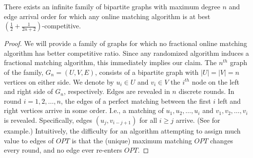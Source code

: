 \begin{thm}\label{thm:hardness}
There exists an infinite family of bipartite graphs with maximum degree $n$ and edge arrival order for which any online matching algorithm is at best $\left(\frac{1}{2}+\frac{1}{2n+2}\right)$-competitive.
\end{thm}
\begin{proof}
We will provide a family of graphs for which no fractional online matching algorithm has better competitive ratio. Since any randomized algorithm induces a fractional matching algorithm, this immediately implies our claim.
The $n^{th}$ graph of the family, $G_n=(U,V,E)$, consists of a bipartite graph with $|U|=|V|=n$ vertices on either side. We denote by $u_i\in U$ and $v_i\in V$ the $i^{th}$ node on the left and right side of $G_n$, respectively. Edges are revealed in $n$ discrete rounds. In round $i=1,2,\dots,n$, the edges of a perfect matching between the first $i$ left and right vertices arrive in some order. I.e., a matching of $u_1,u_2,\dots,u_i$ and $v_1,v_2,\dots,v_i$ is revealed. Specifically, edges $(u_j,v_{i-j+1})$ for all $i\geq j$ arrive. (See  for example.) Intuitively, the difficulty for an algorithm attempting to assign much value to edges of $OPT$ is that the (unique) maximum matching $OPT$ changes every round, and no edge ever re-enters $OPT$.

\newcount\mycount
\newcommand{\DrawRound}[2]{%
	\begin{tikzpicture}[scale=0.66]
    \node[draw, color=white] at (1,-0.25) {\textcolor{black}{$U$}};
    \node[draw, color=white] at (3,-0.25) {\textcolor{black}{$V$}};
    
    \foreach \number in {1,...,#1}
    \node[draw,circle,inner sep=0.01cm] (u-\number) at (1,-\number) {$u_\number$};
    \foreach \number in {1,...,#1}
    \node[draw,circle,inner sep=0.01cm] (v-\number) at (3,-\number) {$v_\number$};
    
    \foreach \number in {1,...,#2}{
    	\foreach \i in {1,...,\number}{
    		\mycount=\number
    		\advance\mycount by -\i
    		\advance\mycount by 1
    		\draw [-, dashed] (u-\i) -- (v-\the\mycount);
    	}
    }
    \foreach \number in {#2}{
    	\foreach \i in {1,...,\number}{
    		\mycount=\number
    		\advance\mycount by -\i
    		\advance\mycount by 1
    		\draw [-, solid, line width=0.75pt] (u-\i) -- (v-\the\mycount);
    	}
    }
	\end{tikzpicture}
}

\newcommand{\subfigRound}[3] {%
	\begin{subfigure}[t]{#3}
	\begin{center}
	\DrawRound{#1}{#2}
	\subcaption{round #2}
	\end{center}
	\end{subfigure}
}


\end{proof}

